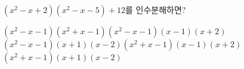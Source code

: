 $(x^2-x+2)(x^2-x-5)+12$를 인수분해하면?
\begin{choicesv}{$(x^2-x-1)(x^2+x-1)$}{$(x^2-x-1)(x-1)(x+2)$}{$(x^2-x-1)(x+1)(x-2)$}{$(x^2+x-1)(x-1)(x+2)$}{$(x^2+x-1)(x+1)(x-2)$}\end{choicesv}
